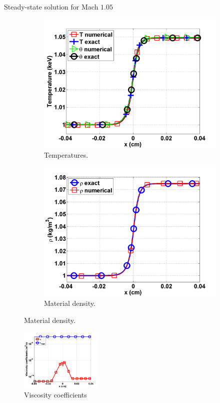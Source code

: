 \documentclass[xcolor=dvipsnames,10pt]{beamer}
\begin{document}
\begin{frame}{Steady-state solution for Mach $1.05$}
\begin{figure}
\begin{subfigure}[b]{0.35\textwidth}
                \centering
                \includegraphics[width=\textwidth]{../figures/Mach_1p05_nel_500_temperature.png}
        \caption{Temperatures.}
\end{subfigure}
\begin{subfigure}[b]{0.35\textwidth}
                \centering
                \includegraphics[width=\textwidth]{../figures/Mach_1p05_nel_500_density}
        \caption{Material density.}
\end{subfigure}
\end{figure}

\begin{figure}
                \centering
                \includegraphics[width=0.35\textwidth]{../figures/Mach_1p05_nel_500_viscosity.png}
        \caption{Viscosity coefficients}
\end{figure}
\end{frame}
\end{document}
